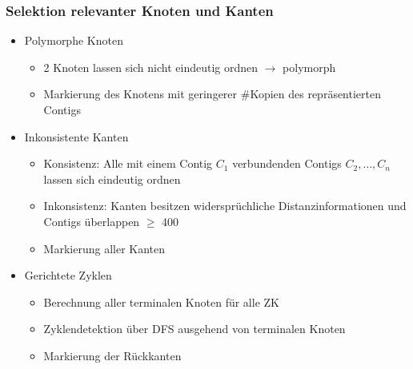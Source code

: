 \documentclass[xcolor=pst]{beamer}
\begin{document}
\begin{frame}
  \frametitle{Selektion relevanter Knoten und Kanten}
  \begin{itemize}
    \item Polymorphe Knoten
    \begin{itemize}
      \item 2 Knoten lassen sich nicht eindeutig ordnen $\rightarrow$ polymorph
      \item Markierung des Knotens mit geringerer \#Kopien des repräsentierten Contigs
    \end{itemize}
    \item Inkonsistente Kanten
    \begin{itemize}
      \item Konsistenz: Alle mit einem Contig $C_1$ verbundenden Contigs $C_2, \ldots, C_n$ lassen sich eindeutig ordnen
      \item Inkonsistenz: Kanten besitzen widersprüchliche Distanzinformationen und Contigs überlappen $\geq$ 400
      \item Markierung aller Kanten
    \end{itemize}
    \item Gerichtete Zyklen
    \begin{itemize}
      \item Berechnung aller terminalen Knoten für alle ZK
      \item Zyklendetektion über DFS ausgehend von terminalen Knoten
      \item Markierung der Rückkanten
    \end{itemize}
  \end{itemize}
\end{frame}
\end{document}
